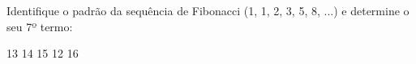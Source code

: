 Identifique o padrão da sequência de Fibonacci (1, 1, 2, 3, 5, 8, ...) e determine o seu 7º termo:

13
14
15
12
16


